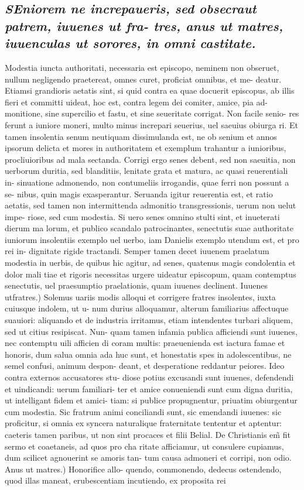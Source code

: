 \documentclass{article}
\begin{document}
\begin{pages}
\subsection*{\textit{\huge\textbf{S}\normalsize Eniorem ne increpaueris, sed obsecraut patrem, iuuenes ut fra- tres, anus ut matres, iuuenculas ut sorores, in omni castitate. }}\pstart Modestia iuncta authoritati, necessaria est episcopo, neminem non obseruet, nullum negligendo praetereat, omnes curet, proficiat omnibus, et me- deatur. Etiamsi grandioris aetatis sint, si quid contra ea quae docuerit episcopus, ab illis fieri et committi uideat, hoc est, contra legem dei comiter, amice, pia ad- monitione, sine supercilio et fastu, et sine seueritate corrigat. Non facile senio- res ferunt a iuniore moneri, multo minus increpari seuerius, uel saeuius obiurga ri. Et tamen insolentia senum neutiquam dissimulanda est, ne ob senium et annos ipsorum delicta et mores in authoritatem et exemplum trahantur a iunioribus, procliuioribus ad mala sectanda. Corrigi ergo senes debent, sed non saeuitia, non uerborum duritia, sed blanditiis, lenitate grata et matura, ac quasi reuerentiali in- sinuatione admonendo, non contumeliis irrogandis, quae ferri non possunt a se- nibus, quin magis exasperantur. Seruanda igitur reuerentia est, et ratio aetatis, sed tamen non intermittenda admonitio transgressionis, uerum non uelut impe- riose, sed cum modestia. Si uero senes omnino stulti sint, et inueterati dierum ma lorum, et publico scandalo patrocinantes, senectutis suae authoritate iuniorum insolentiis exemplo uel uerbo, iam Danielis exemplo utendum est, et pro rei in- dignitate rigide tractandi. Semper tamen decet iuuenem praelatum modestia in uerbis, de quibus hic agitur, ad senes, quatenus magis condolentia et dolor mali tiae et rigoris necessitas urgere uideatur episcopum, quam contemptus senectutis, uel praesumptio praelationis, quam iuuenes declinent. Iuuenes utfratres.) Solemus uariis modis alloqui et corrigere fratres insolentes, iuxta cuiusque indolem, ut u- num durius alloquamur, alterum familiarius affectuque suauiori: aliquando et de industria irritamus, etiam intendentes turbari aliquem, sed ut citius resipiscat. Nun- quam tamen infamia publica afficiendi sunt iuuenes, nec contemptu uili afficien di coram multis: praeuenienda est iactura famae et honoris, dum salua omnia ada huc sunt, et honestatis spes in adolescentibus, ne semel confusi, animum despon- deant, et desperatione reddantur peiores. Ideo contra externos accusatores stu- diose potius excusandi sunt iuuenes, defendendi et uindicandi: uerum familiari- ter et amice conueniendi sunt cum digna duritia, ut intelligant fidem et amici- tiam: si publice propugnentur, priuatim obiurgentur cum modestia. Sic fratrum animi conciliandi sunt, sic emendandi iuuenes: sic proficitur, si omnia ex syncera naturalique fraternitate tententur et aptentur: caeteris tamen paribus, ut non sint procaces et filii Belial. De Christianis em̃ fit sermo et coaetaneis, ad quos pro cha ritate afficiamur, ut consulere cupiamus, dum scilicet agnouerint se amoris tan- tum causa admoneri et corripi, non odio. Anus ut matres.) Honorifice allo- quendo, commonendo, dedecus ostendendo, quod illas maneat, erubescentiam incutiendo, ex proposita rei 
\end{pages}
\end{document}
